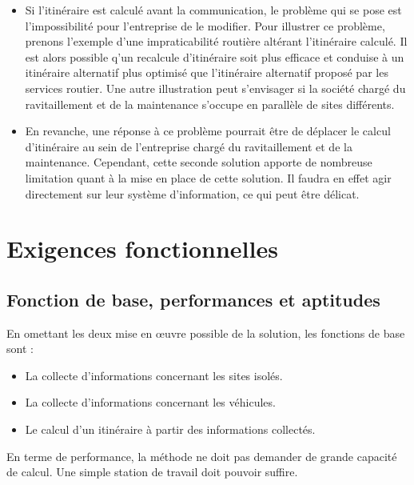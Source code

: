         \begin{itemize}
            \item Si l'itinéraire est calculé avant la communication, le problème qui se pose est l'impossibilité pour l'entreprise de le modifier.
            Pour illustrer ce problème, prenons l'exemple d'une impraticabilité routière altérant l'itinéraire calculé. Il est alors possible q'un recalcule d'itinéraire soit plus efficace et conduise à un itinéraire alternatif plus optimisé que l'itinéraire alternatif proposé par les services routier.
            Une autre illustration peut s'envisager si la société chargé du ravitaillement et de la maintenance s'occupe en parallèle de sites différents.

            \item En revanche, une réponse à ce problème pourrait être de déplacer le calcul d'itinéraire au sein de l'entreprise chargé du ravitaillement et de la maintenance.
            Cependant, cette seconde solution apporte de nombreuse limitation quant à la mise en place de cette solution.
            Il faudra en effet agir directement sur leur système d'information, ce qui peut être délicat.
        \end{itemize}
        
\section{Exigences fonctionnelles}

    \subsection{Fonction de base, performances et aptitudes}

        En omettant les deux mise en œuvre possible de la solution, les fonctions de base sont :
        \begin{itemize}
            \item La collecte d'informations concernant les sites isolés.
            \item La collecte d'informations concernant les véhicules.
            \item Le calcul d'un itinéraire à partir des informations collectés.
        \end{itemize}
        
        En terme de performance, la méthode ne doit pas demander de grande capacité de calcul.
        Une simple station de travail doit pouvoir suffire.

